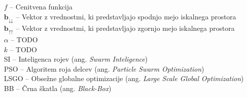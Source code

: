 $f$ -- Cenitvena funkcija \\
$\mathbf{b}_{\downdownarrows}$ -- Vektor z vrednostmi, ki predstavljajo spodnjo mejo iskalnega prostora \\
$\mathbf{b}_{\upuparrows}$ -- Vektor z vrednostmi, ki predstavljajo zgornjo mejo iskalnega prostora \\
$\alpha$ -- TODO \\
$k$ -- TODO \\
SI -- Inteligenca rojev (ang. \textit{Swarm Inteligence}) \\
PSO -- Algoritem roja delcev (ang. \textit{Particle Swarm Optimization}) \\
LSGO -- Obsežne globalne optimizacije (ang. \textit{Large Scale Global Optimization}) \\
BB -- Črna škatla (ang. \textit{Black-Box}) \\